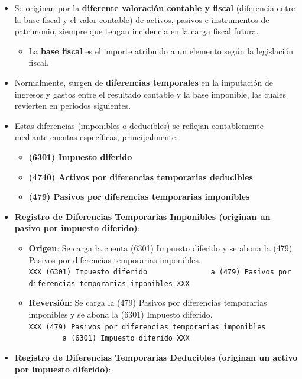 \documentclass[
  paper=a4,
  ,captions=tableheading
]{scrbook}
\providecommand{\tightlist}{%
  \setlength{\itemsep}{0pt}\setlength{\parskip}{0pt}}
\begin{document}
\begin{itemize}
\tightlist
\item
  Se originan por la \textbf{diferente valoración contable y fiscal}
  (diferencia entre la base fiscal y el valor contable) de activos,
  pasivos e instrumentos de patrimonio, siempre que tengan incidencia en
  la carga fiscal futura.

  \begin{itemize}
  \tightlist
  \item
    La \textbf{base fiscal} es el importe atribuido a un elemento según
    la legislación fiscal.
  \end{itemize}
\item
  Normalmente, surgen de \textbf{diferencias temporales} en la
  imputación de ingresos y gastos entre el resultado contable y la base
  imponible, las cuales revierten en periodos siguientes.
\item
  Estas diferencias (imponibles o deducibles) se reflejan contablemente
  mediante cuentas específicas, principalmente:

  \begin{itemize}
  \tightlist
  \item
    \textbf{(6301) Impuesto diferido}
  \item
    \textbf{(4740) Activos por diferencias temporarias deducibles}
  \item
    \textbf{(479) Pasivos por diferencias temporarias imponibles}
  \end{itemize}
\item
  \textbf{Registro de Diferencias Temporarias Imponibles (originan un
  pasivo por impuesto diferido)}:

  \begin{itemize}
  \tightlist
  \item
    \textbf{Origen}: Se carga la cuenta (6301) Impuesto diferido y se
    abona la (479) Pasivos por diferencias temporarias imponibles.
    \texttt{XXX\ (6301)\ Impuesto\ diferido\ \ \ \ \ \ \ \ \ \ \ \ \ \ \ a\ (479)\ Pasivos\ por\ diferencias\ temporarias\ imponibles\ XXX}
  \item
    \textbf{Reversión}: Se carga la (479) Pasivos por diferencias
    temporarias imponibles y se abona la (6301) Impuesto diferido.
    \texttt{XXX\ (479)\ Pasivos\ por\ diferencias\ temporarias\ imponibles\ \ \ \ \ \ \ \ \ \ \ \ \ \ \ a\ (6301)\ Impuesto\ diferido\ XXX}
  \end{itemize}
\item
  \textbf{Registro de Diferencias Temporarias Deducibles (originan un
  activo por impuesto diferido)}:


\end{itemize}
\end{document}
